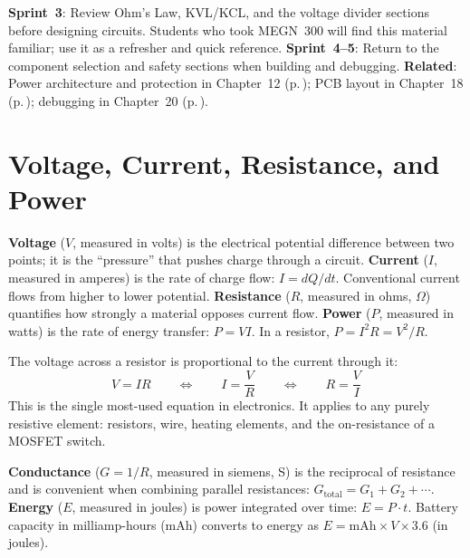 \documentclass[11pt,letterpaper,twoside,openany]{book}
\begin{document}
\begin{tipbox}
\textbf{Sprint~3}: Review Ohm's Law, KVL/KCL, and the voltage divider sections before designing circuits. Students who took MEGN~300 will find this material familiar; use it as a refresher and quick reference. \textbf{Sprint~4--5}: Return to the component selection and safety sections when building and debugging. \textbf{Related}: Power architecture and protection in Chapter~12 (p.\,\pageref{ch:power}); PCB layout in Chapter~18 (p.\,\pageref{ch:pcb}); debugging in Chapter~20 (p.\,\pageref{ch:debug}).
\end{tipbox}

\vspace{1em}

\section{Voltage, Current, Resistance, and Power}

\textbf{Voltage} ($V$, measured in volts) is the electrical potential difference between two points; it is the ``pressure'' that pushes charge through a circuit. \textbf{Current} ($I$, measured in amperes) is the rate of charge flow: $I = dQ/dt$. Conventional current flows from higher to lower potential. \textbf{Resistance} ($R$, measured in ohms, $\Omega$) quantifies how strongly a material opposes current flow. \textbf{Power} ($P$, measured in watts) is the rate of energy transfer: $P = VI$. In a resistor, $P = I^2 R = V^2/R$.

\begin{keyconceptbox}
The voltage across a resistor is proportional to the current through it:
\begin{equation}
V = IR \qquad \Leftrightarrow \qquad I = \frac{V}{R} \qquad \Leftrightarrow \qquad R = \frac{V}{I}
\end{equation}
This is the single most-used equation in electronics. It applies to any purely resistive element: resistors, wire, heating elements, and the on-resistance of a MOSFET switch.
\end{keyconceptbox}

\textbf{Conductance} ($G = 1/R$, measured in siemens, S) is the reciprocal of resistance and is convenient when combining parallel resistances: $G_{\text{total}} = G_1 + G_2 + \cdots$. \textbf{Energy} ($E$, measured in joules) is power integrated over time: $E = P \cdot t$. Battery capacity in milliamp-hours (mAh) converts to energy as $E = \text{mAh} \times V \times 3.6$ (in joules).
\end{document}

